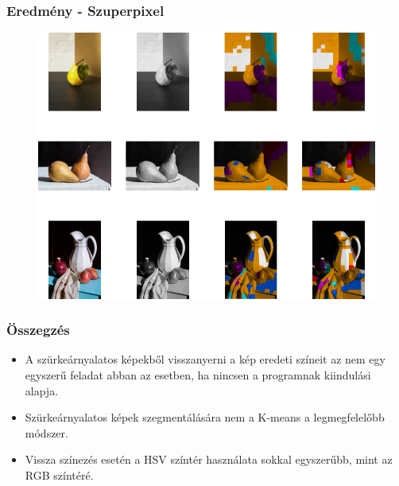 \documentclass{beamer}
\begin{document}
\begin{frame}[fragile]
\frametitle{Eredmény - Szuperpixel}

\begin{figure}[!tbp]
  \centering
  \begin{minipage}[b]{0.8\textwidth}
    \includegraphics[width=\textwidth]{images/result_all_superpixel.png}
  \end{minipage}
\end{figure}

\end{frame}

\begin{frame}[fragile]
\frametitle{Összegzés}
\begin{itemize}
	\item A szürkeárnyalatos képekből visszanyerni a kép eredeti színeit az nem egy egyszerű feladat abban az esetben, ha nincsen a programnak kiindulási alapja.
    \item Szürkeárnyalatos képek szegmentálására nem a K-means a legmegfelelőbb módszer.
    \item Vissza színezés esetén a HSV színtér használata sokkal egyszerűbb, mint az RGB színtéré.
\end{itemize}

\end{frame}
\end{document}
